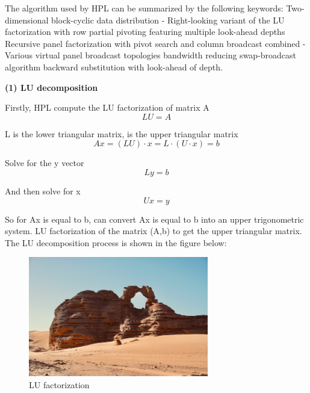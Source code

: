 \documentclass[a4paper,12pt]{article}
\begin{document}
The algorithm used by HPL can be summarized by the following keywords: Two-dimensional block-cyclic data distribution - Right-looking variant of the LU factorization with row partial pivoting featuring multiple look-ahead depths Recursive panel factorization with pivot search and column broadcast combined - Various virtual panel broadcast topologies bandwidth reducing swap-broadcast algorithm backward substitution with look-ahead of depth.

\textbf{(1) LU decomposition}

Firstly, HPL compute the LU factorization of matrix A
\begin{equation*}
LU=A
\end{equation*}

L is the lower triangular matrix, is the upper triangular matrix
\begin{equation*}
Ax=(LU) \cdot x=L \cdot (U \cdot x)=b
\end{equation*}

Solve for the y vector
\begin{equation*}
Ly=b
\end{equation*}

And then solve for x
\begin{equation*}
U x=y
\end{equation*}

So for Ax is equal to b, can convert Ax is equal to b into an upper trigonometric system. LU factorization of the matrix (A,b) to get the upper triangular matrix. The LU decomposition process is shown in the figure below:

\begin{figure}[H]
    \centering
    \includegraphics[width=0.7\textwidth]{LU_factorization.png}
    \caption{LU factorization}
    \label{fig:lu_factorization}
\end{figure}
\end{document}
